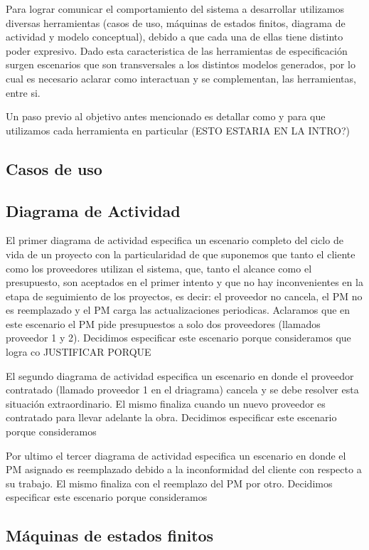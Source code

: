 Para lograr comunicar el comportamiento del sistema a desarrollar utilizamos diversas herramientas (casos de uso, máquinas de estados finitos, diagrama de actividad y modelo conceptual), debido a que cada una de ellas tiene distinto poder expresivo.
Dado esta caracteristica de las herramientas de especificación surgen escenarios que son transversales a los distintos modelos generados, por lo cual es necesario aclarar como interactuan y se complementan, las herramientas, entre si.

Un paso previo al objetivo antes mencionado es detallar como y para que utilizamos cada herramienta en particular (ESTO ESTARIA EN LA INTRO?)
\subsection{Casos de uso}

\subsection{Diagrama de Actividad}
El primer diagrama de actividad especifica un escenario completo del ciclo de vida de un proyecto con la particularidad de que suponemos que tanto el cliente como los proveedores utilizan el sistema, que, tanto el alcance como el presupuesto, son aceptados en el primer intento y que no hay inconvenientes en la etapa de seguimiento de los proyectos, es decir: el proveedor no cancela, el PM no es reemplazado y el PM carga las actualizaciones periodicas. Aclaramos que en este escenario el PM pide presupuestos a solo dos proveedores (llamados proveedor 1 y 2). Decidimos especificar este escenario porque consideramos que logra co
JUSTIFICAR PORQUE

El segundo diagrama de actividad especifica un escenario en donde el proveedor contratado (llamado proveedor 1 en el driagrama) cancela y se debe resolver esta situación extraordinario. El mismo finaliza cuando un nuevo proveedor es contratado para llevar adelante la obra. Decidimos especificar este escenario porque consideramos

Por ultimo el tercer diagrama de actividad especifica un escenario en donde el PM asignado es reemplazado debido a la inconformidad del cliente con respecto a su trabajo. El mismo finaliza con el reemplazo del PM por otro. Decidimos especificar este escenario porque consideramos

\subsection{Máquinas de estados finitos}

